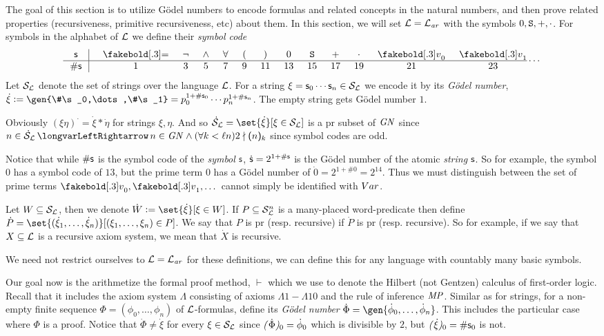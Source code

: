 The goal of this section is to utilize G\"odel numbers to encode formulas and related concepts in the natural numbers, and then prove related properties (recursiveness, primitive recursiveness, etc) about
them.
In this section, we will set ${\cal L}={\cal L}_{\it ar}$ with the symbols $0,{\tt S},+,\cdot$.
For symbols in the alphabet of ${\cal L}$ we define their {\it symbol code}
$$ \vcenter{\vbox{\ialign{\strut\kern.25cm\hfil$#$\hfil\kern.25cm\vrule&&\kern.5cm\hfil$#$\hfil\cr
    {\sf s}&\eq&\neg&\land&\forall&(&)&0&{\tt S}&+&\cdot&\v_0&\v_1\cr\noalign{\hrule}
    \#{\sf s}&1&3&5&7&9&11&13&15&17&19&21&23\cr
}}}\cdots $$
Let ${\cal S}_{\cal L}$ denote the set of strings over the language ${\cal L}$.
For a string $\xi={\sf s}_0\cdots{\sf s}_n\in{\cal S}_{\cal L}$ we encode it by its {\it G\"odel number}, $\dot\xi\coloneqq\gen{\#\s_0,\dots,\#\s_1}=p_0^{1+\#\s_0}\cdots p_n^{1+\#\s_n}$.
The empty string gets G\"odel number $1$.

Obviously $(\xi\eta)^\cdot=\dot\xi*\dot\eta$ for strings $\xi,\eta$.
And so $\dot{\cal S}_{\cal L}=\set{\dot\xi}[\xi\in{\cal S}_{\cal L}]$ is a pr subset of ${\it GN}$ since $n\in\dot{\cal S}_{\cal L}\iff n\in{\it GN}\land(\forall k<\ell n)2\ndivides\bparens{n}_k$ since
symbol codes are odd.

Notice that while $\#{\sf s}$ is the symbol code of the {\it symbol} ${\sf s}$, $\dot{{\sf s}}=2^{1+\#{\sf s}}$ is the G\"odel number of the atomic {\it string} ${\sf s}$.
So for example, the symbol $0$ has a symbol code of $13$, but the prime term $0$ has a G\"odel number of $\dot0=2^{1+\#0}=2^{14}$.
Thus we must distinguish between the set of prime terms $\v_0,\v_1,\dots$ cannot simply be identified with ${\sl Var}$.

Let $W\subseteq{\cal S}_{\cal L}$, then we denote $\dot W\coloneqq\set{\dot\xi}[\xi\in W]$.
If $P\subseteq{\cal S}_{\cal L}^n$ is a many-placed word-predicate then define $\dot P=\set{(\dot\xi_1,\dots,\dot\xi_n)}[(\xi_1,\dots,\xi_n)\in P]$.
We say that $P$ is pr (resp. recursive) if $\dot P$ is pr (resp. recursive).
So for example, if we say that $X\subseteq{\cal L}$ is a recursive axiom system, we mean that $\dot X$ is recursive.

We need not restrict ourselves to ${\cal L}={\cal L}_{\it ar}$ for these definitions, we can define this for any language with countably many basic symbols.

Our goal now is the arithmetize the formal proof method, $\vdash$ which we use to denote the Hilbert (not Gentzen) calculus of first-order logic.
Recall that it includes the axiom system $\Lambda$ consisting of axioms $\Lambda1-\Lambda10$ and the rule of inference ${\it MP}$.
Similar as for strings, for a non-empty finite sequence $\Phi=(\phi_0,\dots,\phi_n)$ of ${\cal L}$-formulas, define its {\it G\"odel number} $\dot\Phi=\gen{\dot\phi_0,\dots,\dot\phi_n}$.
This includes the particular case where $\Phi$ is a proof.
Notice that $\dot\Phi\neq\dot\xi$ for every $\xi\in{\cal S}_{\cal L}$ since $\bparens{\dot\Phi}_0=\dot\phi_0$ which is divisible by $2$, but $\bparens{\dot\xi}_0=\#\s_0$ is not.

